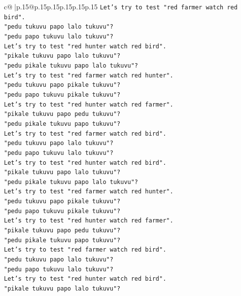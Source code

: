 \documentclass{article}
\begin{document}
{\begin{supertabular}{c@{$\;$}|p{.15\linewidth}@{}p{.15\linewidth}p{.15\linewidth}p{.15\linewidth}p{.15\linewidth}p{.15\linewidth}}
{{{\texttt{Let's try to test "red farmer watch red bird".} \\
\texttt{"pedu tukuvu papo lalo tukuvu"?} \\
\texttt{"pedu papo tukuvu lalo tukuvu"?} \\
\texttt{Let's try to test "red hunter watch red bird".} \\
\texttt{"pikale tukuvu papo lalo tukuvu"?} \\
\texttt{"pedu pikale tukuvu papo lalo tukuvu"?} \\
\texttt{Let's try to test "red farmer watch red hunter".} \\
\texttt{"pedu tukuvu papo pikale tukuvu"?} \\
\texttt{"pedu papo tukuvu pikale tukuvu"?} \\
\texttt{Let's try to test "red hunter watch red farmer".} \\
\texttt{"pikale tukuvu papo pedu tukuvu"?} \\
\texttt{"pedu pikale tukuvu papo tukuvu"?} \\
\texttt{Let's try to test "red farmer watch red bird".} \\
\texttt{"pedu tukuvu papo lalo tukuvu"?} \\
\texttt{"pedu papo tukuvu lalo tukuvu"?} \\
\texttt{Let's try to test "red hunter watch red bird".} \\
\texttt{"pikale tukuvu papo lalo tukuvu"?} \\
\texttt{"pedu pikale tukuvu papo lalo tukuvu"?} \\
\texttt{Let's try to test "red farmer watch red hunter".} \\
\texttt{"pedu tukuvu papo pikale tukuvu"?} \\
\texttt{"pedu papo tukuvu pikale tukuvu"?} \\
\texttt{Let's try to test "red hunter watch red farmer".} \\
\texttt{"pikale tukuvu papo pedu tukuvu"?} \\
\texttt{"pedu pikale tukuvu papo tukuvu"?} \\
\texttt{Let's try to test "red farmer watch red bird".} \\
\texttt{"pedu tukuvu papo lalo tukuvu"?} \\
\texttt{"pedu papo tukuvu lalo tukuvu"?} \\
\texttt{Let's try to test "red hunter watch red bird".} \\
\texttt{"pikale tukuvu papo lalo tukuvu"?} \\
}}}
\end{supertabular}}
\end{document}
